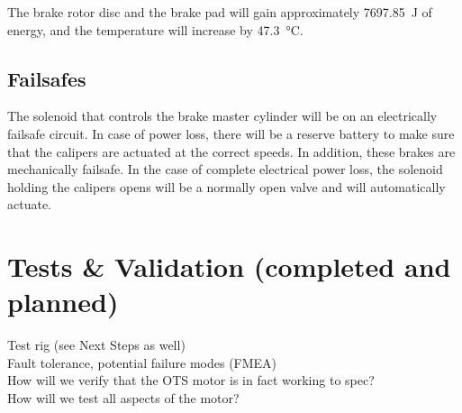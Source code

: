 \documentclass[main.tex]{subfiles}
\begin{document}
    The brake rotor disc and the brake pad will gain approximately \SI{7697.85}{J} of energy, and the temperature will increase by \SI{47.3}{\celsius}.\\

    \subsection{Failsafes}
    The solenoid that controls the brake master cylinder will be on an electrically failsafe circuit. In case of power loss, there will be a reserve battery to make sure that the calipers are actuated at the correct speeds. In addition, these brakes are mechanically failsafe. In the case of complete electrical power loss, the solenoid holding the calipers opens will be a normally open valve and will automatically actuate.

    \section{Tests \& Validation (completed and planned)}
    Test rig (see Next Steps as well)\\
    Fault tolerance, potential failure modes (FMEA)\\
    How will we verify that the OTS motor is in fact working to spec?\\
    How will we test all aspects of the motor?
\end{document}
